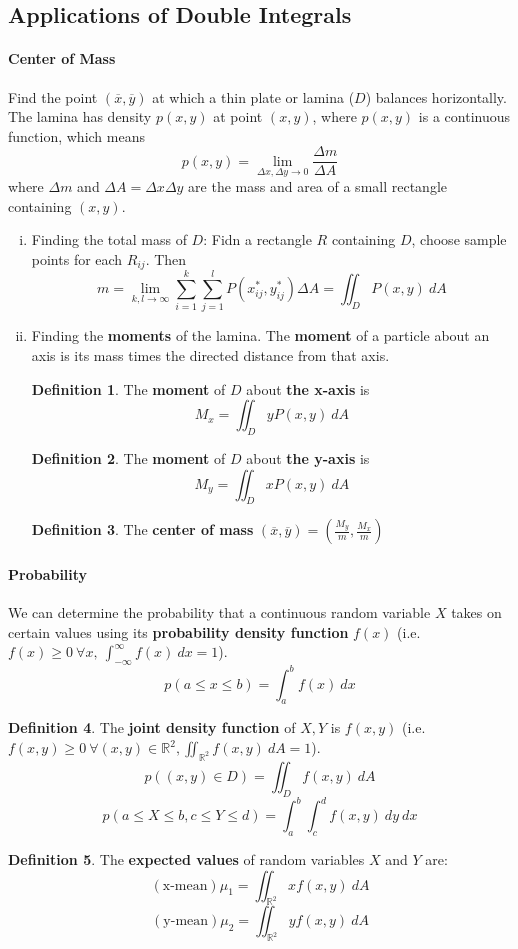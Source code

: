 \documentclass[12 pt]{article}
\theoremstyle{definition}
\newtheorem{defn}{Definition}
\begin{document}
\subsection{Applications of Double Integrals}
\paragraph{Center of Mass} Find the point $(\overline{x},\overline{y})$ at which a thin plate or lamina ($D$) balances horizontally.
\\ The lamina has density $p(x,y)$ at point $(x,y)$, where $p(x,y)$ is a continuous function, which means
$$ p(x,y)=\lim_{\Delta x, \Delta y \to 0} \frac{\Delta m}{\Delta A}$$ where $\Delta m$ and $\Delta A = \Delta x \Delta y$ are the mass and area of a small rectangle containing $(x,y)$.
\begin{enumerate}[i)]
\item Finding the total mass of $D$: Fidn a rectangle $R$ containing $D$, choose sample points for each $R_{ij}$. Then
  $$ m = \lim_{k,l \to \infty} \sum_{i=1}^{k}\sum_{j=1}^{l}P(x_{ij}^*,y_{ij}^*)\Delta A=\iint_D P(x,y)\ dA$$
\item Finding the \textbf{moments} of the lamina. The \textbf{moment} of a particle about an axis is its mass times the directed distance from that axis.
  \begin{defn}
    The \textbf{moment} of $D$ about \textbf{the x-axis} is
    $$M_x = \iint_D y P(x,y)\ dA$$
  \end{defn}
  \begin{defn}
    The \textbf{moment} of $D$ about \textbf{the y-axis} is
    $$ M_y = \iint_D x P(x,y)\ dA$$
  \end{defn}
  \begin{defn}
    The \textbf{center of mass} $(\overline{x},\overline{y})=\left(\frac{M_y}{m},\frac{M_x}{m}\right)$
  \end{defn}
\end{enumerate}
\paragraph{Probability} We can determine the probability that a continuous random variable $X$ takes on certain values using its \textbf{probability density function} $f(x)$ (i.e. $f(x)\geq 0 \ \forall x, \ \int_{-\infty}^{\infty}f(x)\ dx=1$).
$$p(a\leq x \leq b)=\int_{a}^{b}f(x)\ dx$$
\begin{defn}
  The \textbf{joint density function} of $X, Y$ is $f(x,y)$ (i.e. $f(x,y)\geq 0 \ \forall (x,y)\in \mathbb{R}^2, \iint_{\mathbb{R}^2}f(x,y)\ dA=1$).
  $$p((x,y)\in D)=\iint_D f(x,y)\ dA$$
  $$p(a \leq X \leq b, c \leq Y \leq d)=\int_a^b\int_c^d f(x,y)\ dy \ dx$$
\end{defn}
\begin{defn}
  The \textbf{expected values} of random variables $X$ and $Y$ are:
  $$(\text{x-mean}) \mu_1 = \iint_{\mathbb{R}^2}xf(x,y)\ dA $$
  $$(\text{y-mean}) \mu_2 = \iint_{\mathbb{R}^2}yf(x,y)\ dA $$
\end{defn}
\end{document}
